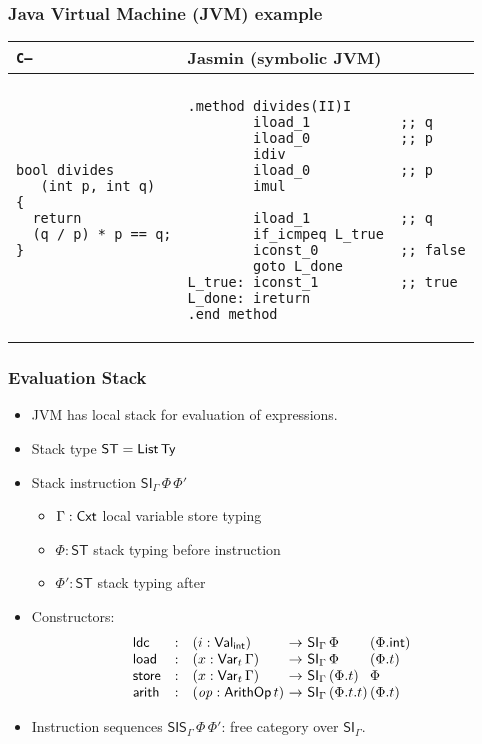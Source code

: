 \documentclass[t,fleqn,usenames,dvipsnames]{beamer}
\newcommand{\tVal}{\mathsf{Val}}
\newcommand{\Val}[1][]{\tVal_{#1}}
\newcommand{\Var}[2][]{\mathsf{Var}_{#1}\,#2}
\newcommand{\vop}{\mathit{op}}
\newcommand{\tarith}{\mathsf{arith}}
\newcommand{\tArithOp}{\mathsf{ArithOp}}
\newcommand{\ArithOp}[1]{\tArithOp\,#1}
\newcommand{\tldc}{\mathsf{ldc}}
\newcommand{\tload}{\mathsf{load}}
\newcommand{\tstore}{\mathsf{store}}
\newcommand{\tint}{\mathsf{int}}
\newcommand{\ST}{\mathsf{ST}}
\newcommand{\tSI}{\mathsf{SI}}
\newcommand{\SI}[3][]{\tSI_{#1}\,#2\,#3}
\newcommand{\tSIs}{\mathsf{SIS}}
\newcommand{\SIs}[3][]{\tSIs_{#1}\,#2\,#3}
\newcommand{\Cmm}{\texttt{C--}\xspace}
\begin{document}
\begin{frame}[fragile]%
  \frametitle{Java Virtual Machine (JVM) example}
  \vspace{-1ex}
  \begin{tabular}{l@{\qquad}l}
  \Cmm & Jasmin (symbolic JVM) \\
\hline
\\[-1ex]
    \begin{minipage}[t]{0.3\linewidth}
\begin{verbatim}
bool divides
   (int p, int q)
{
  return
  (q / p) * p == q;
}
\end{verbatim}
    \end{minipage}
& %
  \begin{minipage}[t]{0.5\linewidth}
\begin{verbatim}
.method divides(II)I
        iload_1           ;; q
        iload_0           ;; p
        idiv
        iload_0           ;; p
        imul

        iload_1           ;; q
        if_icmpeq L_true
        iconst_0          ;; false
        goto L_done
L_true: iconst_1          ;; true
L_done: ireturn
.end method
\end{verbatim}
  \end{minipage}
  \end{tabular}
\end{frame}


\begin{frame}%
  \frametitle{Evaluation Stack}
  \vspace{-3ex}
  \begin{itemize}
  \item JVM has local stack for evaluation of expressions.
  \item Stack type $\ST = \List\,\Ty$
  \item Stack instruction $\SI[\Gamma]\Phi{\Phi'}$
    \begin{itemize}
    \item $\Gamma : \mathsf{Cxt}$ local variable store typing
    \item $\Phi   : \ST$ stack typing before instruction
    \item $\Phi'  : \ST$ stack typing after
    \end{itemize}
  \item Constructors:
\[
\begin{array}{lcl@{~}c@{~}l@{}l}
  \tldc & : & (i : \Val[\tint]) & \to & \SI[\Gamma]\Phi{&(\Phi.\tint)} \\
  \tload & : & (x : \Var[t]\Gamma) & \to & \SI[\Gamma]\Phi{&(\Phi.t)} \\
  \tstore & : & (x : \Var[t]\Gamma) & \to & \SI[\Gamma]{(\Phi.t)}{&\Phi} \\
  \tarith & : & (\vop : \ArithOp t) & \to & \SI[\Gamma]{(\Phi.t.t)}{&(\Phi.t)}
\end{array}
\]
  \item Instruction sequences $\SIs[\Gamma]\Phi{\Phi'}$: free category over $\tSI_\Gamma$.
  \end{itemize}
\end{frame}
\end{document}
